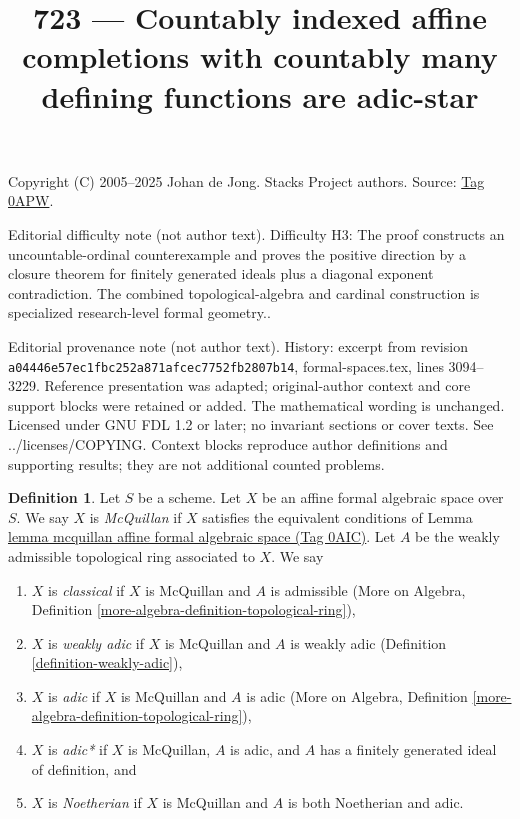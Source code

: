 \documentclass{amsart}
\theoremstyle{plain}
\theoremstyle{definition}
\newtheorem{definition}[subsection]{Definition}
\theoremstyle{remark}
\numberwithin{equation}{subsection}
\begin{document}
\title[Stacks Project, Tag 0APW]{723 --- Countably indexed affine completions with countably many defining functions are adic-star}
\maketitle
\noindent Copyright (C) 2005--2025 Johan de Jong. Stacks Project authors. Source: \href{https://stacks.math.columbia.edu/tag/0APW}{Tag 0APW}.

\noindent Editorial difficulty note (not author text). Difficulty H3: The proof constructs an uncountable-ordinal counterexample and proves the positive direction by a closure theorem for finitely generated ideals plus a diagonal exponent contradiction. The combined topological-algebra and cardinal construction is specialized research-level formal geometry..

\noindent Editorial provenance note (not author text). History: excerpt from revision \texttt{a0444\allowbreak 6e57e\allowbreak c1fbc\allowbreak 252a8\allowbreak 71afc\allowbreak ec775\allowbreak 2fb28\allowbreak 07b14}, formal-spaces.tex, lines 3094--3229. Reference presentation was adapted; original-author context and core support blocks were retained or added. The mathematical wording is unchanged. Licensed under GNU FDL 1.2 or later; no invariant sections or cover texts. See ../licenses/COPYING. Context blocks reproduce author definitions and supporting results; they are not additional counted problems.

\begin{definition}
\label{definition-types-affine-formal-algebraic-space}
Let $S$ be a scheme. Let $X$ be an affine formal algebraic space over $S$.
We say $X$ is {\it McQuillan} if $X$ satisfies the equivalent conditions
of Lemma \href{https://stacks.math.columbia.edu/tag/0AIC}{lemma mcquillan affine formal algebraic space (Tag 0AIC)}. Let $A$
be the weakly admissible topological ring associated to $X$. We say
\begin{enumerate}
\item $X$ is {\it classical} if $X$ is McQuillan and $A$ is admissible
(More on Algebra, Definition \ref{more-algebra-definition-topological-ring}),
\item $X$ is {\it weakly adic} if $X$ is McQuillan and $A$ is weakly adic
(Definition \ref{definition-weakly-adic}),
\item $X$ is {\it adic} if $X$ is McQuillan and $A$ is adic
(More on Algebra, Definition \ref{more-algebra-definition-topological-ring}),
\item $X$ is {\it adic*} if $X$ is McQuillan, $A$ is adic, and $A$
has a finitely generated ideal of definition, and
\item $X$ is {\it Noetherian} if $X$ is McQuillan and $A$ is
both Noetherian and adic.
\end{enumerate}
\end{definition}
\end{document}
